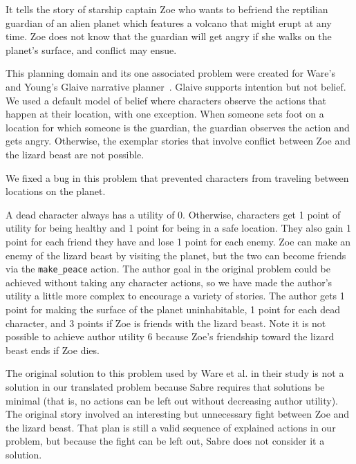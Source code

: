 \documentclass{nilreport}
\makeatletter
\renewcommand{\bibentry}[1]{\nocite{#1}{\frenchspacing\@nameuse{BR@r@#1\@extra@b@citeb}}}
\makeatother
\begin{document}
\begin{quote}
	\bibentry{ware2014thesis}
\end{quote}

\noindent It tells the story of starship captain Zoe who wants to
befriend the reptilian guardian of an alien planet which features
a volcano that might erupt at any time. Zoe does not know that the
guardian will get angry if she walks on the planet's surface, and
conflict may ensue.

This planning domain and its one associated problem were created for
Ware's and Young's Glaive narrative planner~\cite{ware2014glaive}.
Glaive supports intention but not belief. We used a default model
of belief where characters observe the actions that happen at their
location, with one exception. When someone sets foot on a location
for which someone is the guardian, the guardian observes the action
and gets angry. Otherwise, the exemplar stories that involve conflict
between Zoe and the lizard beast are not possible.

We fixed a bug in this problem that prevented characters from traveling
between locations on the planet.

A dead character always has a utility of 0. Otherwise, characters
get 1 point of utility for being healthy and 1 point for being in
a safe location. They also gain 1 point for each friend they have
and lose 1 point for each enemy. Zoe can make an enemy of the lizard
beast by visiting the planet, but the two can become friends via the
\texttt{make\_peace} action. The author goal in the original problem
could be achieved without taking any character actions, so we have
made the author's utility a little more complex to encourage a variety
of stories. The author gets 1 point for making the surface of the
planet uninhabitable, 1 point for each dead character, and 3 points
if Zoe is friends with the lizard beast. Note it is not possible to
achieve author utility 6 because Zoe's friendship toward the lizard
beast ends if Zoe dies.

The original solution to this problem used by Ware et al. in their
study is not a solution in our translated problem because Sabre requires
that solutions be minimal (that is, no actions can be left out without
decreasing author utility). The original story involved an interesting
but unnecessary fight between Zoe and the lizard beast. That plan
is still a valid sequence of explained actions in our problem, but
because the fight can be left out, Sabre does not consider it a solution.
\end{document}
